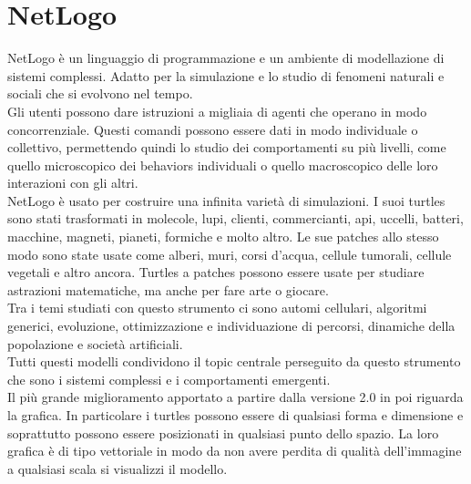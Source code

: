 \section {NetLogo} 
\label{sec:netlogo}
NetLogo \nocite{wilensky-tisue} \cite{netlogo} è un linguaggio di programmazione e un ambiente di modellazione di sistemi complessi. Adatto per la simulazione e lo studio di fenomeni naturali e sociali che si evolvono nel tempo.\\
Gli utenti possono dare istruzioni a migliaia di agenti che operano in modo concorrenziale. Questi comandi possono essere dati in modo individuale o collettivo, permettendo quindi lo studio dei comportamenti su più livelli, come quello microscopico dei behaviors individuali o quello macroscopico delle loro interazioni con gli altri.\\
NetLogo è usato per costruire una infinita varietà di simulazioni. I suoi turtles sono stati trasformati in molecole, lupi, clienti, commercianti, api, uccelli, batteri, macchine, magneti, pianeti, formiche e molto altro. Le sue patches allo stesso modo sono state usate come alberi, muri, corsi d'acqua, cellule tumorali, cellule vegetali e altro ancora. Turtles a patches possono essere usate per studiare astrazioni matematiche, ma anche per fare arte o giocare.\\
Tra i temi studiati con questo strumento ci sono automi cellulari, algoritmi generici, evoluzione, ottimizzazione e individuazione di percorsi, dinamiche della popolazione e società artificiali.\\
Tutti questi modelli condividono il topic centrale perseguito da questo strumento che sono i sistemi complessi e i comportamenti emergenti.\\
Il più grande miglioramento apportato a partire dalla versione 2.0 in poi riguarda la grafica. In particolare i turtles possono essere di qualsiasi forma e dimensione e soprattutto possono essere posizionati in qualsiasi punto dello spazio. La loro grafica è di tipo vettoriale in modo da non avere perdita di qualità dell'immagine a qualsiasi scala si visualizzi il modello.\\

